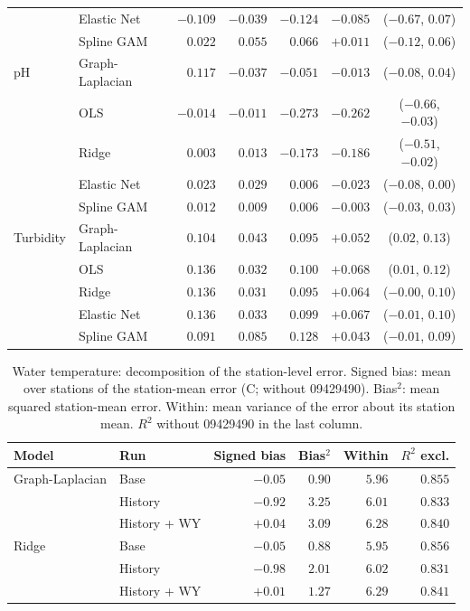 \documentclass[11pt]{article}
\begin{document}
\begin{table}[h]
\begin{tabular}{ll rrr rc}
              & Elastic Net     & $-0.109$ & $-0.039$ & $-0.124$ & $-0.085$ & ($-0.67$, $0.07$) \\
              & Spline GAM      & $0.022$ & $0.055$ & $0.066$ & $+0.011$ & ($-0.12$, $0.06$) \\
\addlinespace
pH            & Graph-Laplacian & $0.117$ & $-0.037$ & $-0.051$ & $-0.013$ & ($-0.08$, $0.04$) \\
              & OLS             & $-0.014$ & $-0.011$ & $-0.273$ & $\mathbf{-0.262}$ & ($-0.66$, $-0.03$) \\
              & Ridge           & $0.003$ & $0.013$ & $-0.173$ & $\mathbf{-0.186}$ & ($-0.51$, $-0.02$) \\
              & Elastic Net     & $0.023$ & $0.029$ & $0.006$ & $-0.023$ & ($-0.08$, $0.00$) \\
              & Spline GAM      & $0.012$ & $0.009$ & $0.006$ & $-0.003$ & ($-0.03$, $0.03$) \\
\addlinespace
Turbidity     & Graph-Laplacian & $0.104$ & $0.043$ & $0.095$ & $\mathbf{+0.052}$ & ($0.02$, $0.13$) \\
              & OLS             & $0.136$ & $0.032$ & $0.100$ & $\mathbf{+0.068}$ & ($0.01$, $0.12$) \\
              & Ridge           & $0.136$ & $0.031$ & $0.095$ & $+0.064$ & ($-0.00$, $0.10$) \\
              & Elastic Net     & $0.136$ & $0.033$ & $0.099$ & $+0.067$ & ($-0.01$, $0.10$) \\
              & Spline GAM      & $0.091$ & $0.085$ & $0.128$ & $+0.043$ & ($-0.01$, $0.09$) \\
\bottomrule
\end{tabular}
\end{table}

\begin{table}[h]
\centering
\small
\caption{Water temperature: decomposition of the station-level error. Signed bias: mean over
stations of the station-mean error (\textdegree C; without 09429490). Bias$^2$: mean squared
station-mean error. Within: mean variance of the error about its station mean. $R^2$ without
09429490 in the last column.}
\label{tab:wtdecomp}
\begin{tabular}{ll rrrr}
\toprule
Model & Run & Signed bias & Bias$^2$ & Within & $R^2$ excl. \\
\midrule
Graph-Laplacian & Base         & $-0.05$ & $0.90$ & $5.96$ & $0.855$ \\
                & History      & $-0.92$ & $3.25$ & $6.01$ & $0.833$ \\
                & History + WY & $+0.04$ & $3.09$ & $6.28$ & $0.840$ \\
\addlinespace
Ridge           & Base         & $-0.05$ & $0.88$ & $5.95$ & $0.856$ \\
                & History      & $-0.98$ & $2.01$ & $6.02$ & $0.831$ \\
                & History + WY & $+0.01$ & $1.27$ & $6.29$ & $0.841$ \\
\bottomrule
\end{tabular}
\end{table}
\end{document}
